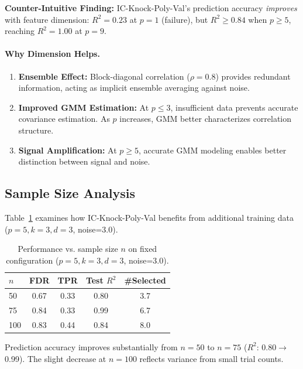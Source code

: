 \textbf{Counter-Intuitive Finding:} IC-Knock-Poly-Val's prediction accuracy \textit{improves} with feature dimension: $R^2 = 0.23$ at $p=1$ (failure), but $R^2 \geq 0.84$ when $p \geq 5$, reaching $R^2 = 1.00$ at $p=9$.

\paragraph{Why Dimension Helps.}
\begin{enumerate}
    \item \textbf{Ensemble Effect:} Block-diagonal correlation ($\rho=0.8$) provides redundant information, acting as implicit ensemble averaging against noise.
    \item \textbf{Improved GMM Estimation:} At $p \leq 3$, insufficient data prevents accurate covariance estimation. As $p$ increases, GMM better characterizes correlation structure.
    \item \textbf{Signal Amplification:} At $p \geq 5$, accurate GMM modeling enables better distinction between signal and noise.
\end{enumerate}

\subsection{Sample Size Analysis}
\label{subsec:sample-size}

Table~\ref{tab:varying-n} examines how IC-Knock-Poly-Val benefits from additional training data ($p=5, k=3, d=3$, noise=3.0).

\begin{table}[htbp]
\centering
\caption{Performance vs. sample size $n$ on fixed configuration ($p=5, k=3, d=3$, noise=3.0).}
\label{tab:varying-n}
\small
\begin{tabular}{lcccc}
\toprule
$n$ & \textbf{FDR} & \textbf{TPR} & \textbf{Test $R^2$} & \textbf{\#Selected} \\
\midrule
50 & 0.67 & 0.33 & 0.80 & 3.7 \\
75 & 0.84 & 0.33 & 0.99 & 6.7 \\
100 & 0.83 & 0.44 & 0.84 & 8.0 \\
\bottomrule
\end{tabular}
\end{table}

Prediction accuracy improves substantially from $n=50$ to $n=75$ ($R^2$: 0.80$\rightarrow$0.99). The slight decrease at $n=100$ reflects variance from small trial counts.

